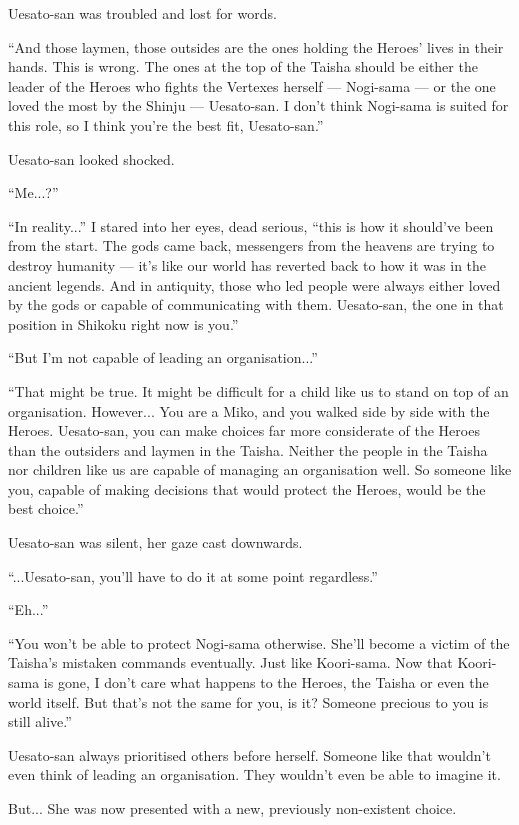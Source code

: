 Uesato-san was troubled and lost for words.

``And those laymen, those outsides are the ones holding the Heroes' lives in their hands. This is wrong. The ones at the top of the Taisha should be either the leader of the Heroes who fights the Vertexes herself --- Nogi-sama --- or the one loved the most by the Shinju --- Uesato-san. I don't think Nogi-sama is suited for this role, so I think you're the best fit, Uesato-san.''

Uesato-san looked shocked.

``Me...?''

``In reality...'' I stared into her eyes, dead serious, ``this is how it should've been from the start. The gods came back, messengers from the heavens are trying to destroy humanity --- it's like our world has reverted back to how it was in the ancient legends. And in antiquity, those who led people were always either loved by the gods or capable of communicating with them. Uesato-san, the one in that position in Shikoku right now is you.''

``But I'm not capable of leading an organisation...''

``That might be true. It might be difficult for a child like us to stand on top of an organisation. However... You are a Miko, and you walked side by side with the Heroes. Uesato-san, you can make choices far more considerate of the Heroes than the outsiders and laymen in the Taisha. Neither the people in the Taisha nor children like us are capable of managing an organisation well. So someone like you, capable of making decisions that would protect the Heroes, would be the best choice.''

Uesato-san was silent, her gaze cast downwards.

``...Uesato-san, you'll have to do it at some point regardless.''

``Eh...''

``You won't be able to protect Nogi-sama otherwise. She'll become a victim of the Taisha's mistaken commands eventually. Just like Koori-sama. Now that Koori-sama is gone, I don't care what happens to the Heroes, the Taisha or even the world itself. But that's not the same for you, is it? Someone precious to you is still alive.''

Uesato-san always prioritised others before herself. Someone like that wouldn't even think of leading an organisation. They wouldn't even be able to imagine it.

But... She was now presented with a new, previously non-existent choice.

